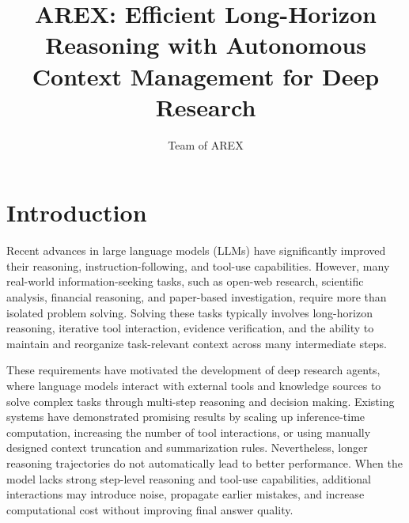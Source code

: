 \documentclass[]{selfevolagent}
\title{AREX: Efficient Long-Horizon Reasoning with Autonomous Context Management for Deep Research}
\author{Team of AREX}
\affiliation{
\vspace{0.5em}
Beijing Academy of Artificial Intelligence (BAAI)
}
\theoremstyle{plain}
\theoremstyle{definition}
\theoremstyle{remark}
\newcommand\blfootnote[1]{%
  \begingroup
  \renewcommand\thefootnote{}\footnote{#1}%
  \addtocounter{footnote}{-1}%
  \endgroup
}
\begin{document}
\maketitle




\section{Introduction}
\label{sec:intro}


Recent advances in large language models (LLMs) have significantly improved their reasoning, instruction-following, and tool-use capabilities. However, many real-world information-seeking tasks, such as open-web research, scientific analysis, financial reasoning, and paper-based investigation, require more than isolated problem solving. Solving these tasks typically involves long-horizon reasoning, iterative tool interaction, evidence verification, and the ability to maintain and reorganize task-relevant context across many intermediate steps.

These requirements have motivated the development of deep research agents, where language models interact with external tools and knowledge sources to solve complex tasks through multi-step reasoning and decision making. Existing systems have demonstrated promising results by scaling up inference-time computation, increasing the number of tool interactions, or using manually designed context truncation and summarization rules. Nevertheless, longer reasoning trajectories do not automatically lead to better performance. When the model lacks strong step-level reasoning and tool-use capabilities, additional interactions may introduce noise, propagate earlier mistakes, and increase computational cost without improving final answer quality.
\end{document}

